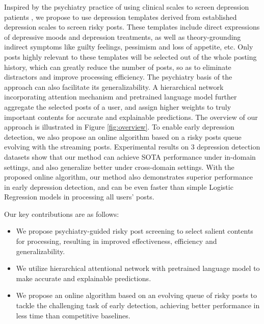 Inspired by the psychiatry practice of using clinical scales to screen depression patients \citep{beck1996beck}, we propose to use depression templates derived from established depression scales to screen risky posts. These templates include direct expressions of depressive moods and depression treatments, as well as theory-grounding indirect symptoms like guilty feelings, pessimism and loss of appetite, etc. Only posts highly relevant to these templates will be selected out of the whole posting history, which can greatly reduce the number of posts, so as to eliminate distractors and improve processing efficiency. The psychiatry basis of the approach can also facilitate its generalizability. A hierarchical network incorporating attention mechanism \citep{yang2016hierarchical} and pretrained language model \citep{devlin2018bert} further aggregate the selected posts of a user, and assign higher weights to truly important contents for accurate and explainable predictions. The overview of our approach is illustrated in Figure \ref{fig:overview}. To enable early depression detection, we also propose an online algorithm based on a risky posts queue evolving with the streaming posts. Experimental results on 3 depression detection datasets show that our method can achieve SOTA performance under in-domain settings, and also generalize better under cross-domain settings. With the proposed online algorithm, our method also demonstrates superior performance in early depression detection, and can be even faster than simple Logistic Regression models in processing all users' posts.

Our key contributions are as follows:
\begin{itemize}
    \item We propose psychiatry-guided risky post screening to select salient contents for processing, resulting in improved effectiveness, efficiency and generalizability.
    \item We utilize hierarchical attentional network with pretrained language model to make accurate and explainable predictions.
    \item We propose an online algorithm based on an evolving queue of risky posts to tackle the challenging task of early detection, achieving better performance in less time than competitive baselines. 
\end{itemize}
